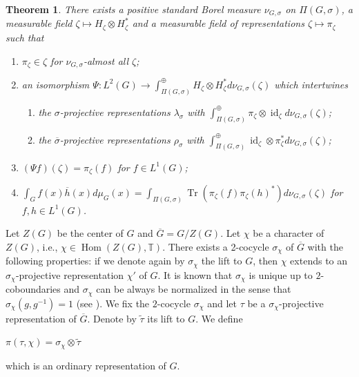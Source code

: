 \documentclass[11pt]{article}
\theoremstyle{plain}
\newtheorem{theorem}{Theorem}[section]
\theoremstyle{remark}
\theoremstyle{definition}
\DeclareMathOperator{\Hom}{Hom}
\DeclareMathOperator{\Tr}{Tr}
\DeclareMathOperator{\id}{id}
\begin{document}
\begin{theorem}\label{tprojPthm}%
There exists a positive standard Borel measure $\nu_{G,\sigma}$ on $\Pi(G,\sigma)$, a measurable field $\zeta\mapsto H_{\zeta}\otimes H_{\zeta}^{*}$ and a measurable field of representations $\zeta\mapsto \pi_{\zeta}$ such that
\begin{enumerate}
    \item $\pi_{\zeta}\in \zeta$ for $\nu_{G,\sigma}$-almost all $\zeta$;
    \item an isomorphism $\Psi\colon L^2(G)\to \int_{\Pi(G,\sigma)}^{\oplus}H_{\zeta}\otimes H_{\zeta}^{*}d \nu_{G,\sigma}(\zeta)$ which intertwines
    \begin{enumerate}
        \item the $\sigma$-projective representations $\lambda_{\sigma}$ with $\int_{\Pi(G,\sigma)}^{\oplus}\pi_{\zeta}\otimes \id_{\zeta}d \nu_{G,\sigma}(\zeta)$;
        \item the $\overline{\sigma}$-projective representations $\rho_{\sigma}$ with $\int_{\Pi(G,\sigma)}^{\oplus}\id_{\zeta}\otimes\pi_{\zeta}^{*} d \nu_{G,\sigma}(\zeta)$;
    \end{enumerate}
    \item $(\Psi f)(\zeta)=\pi_{\zeta}(f)$ for $f\in L^1(G)$;
    \item $\int_{G}f(x)\overline{h}(x)d \mu_{G}(x)=\int_{\Pi(G,\sigma)}\Tr(\pi_{\zeta}(f)\pi_{\zeta}(h)^{*})d \nu_{G,\sigma}(\zeta)$ for $f,h\in L^1(G)$. 
\end{enumerate}
\end{theorem}

Let $Z(G)$ be the center of $G$ and $\overline{G}=G/Z(G)$. 
Let $\chi$ be a character of $Z(G)$, i.e., $\chi\in \Hom(Z(G),\mathbb{T})$.   
There exists a 2-cocycle $\sigma_{\chi}$ of $\overline{G}$ with the following properties: if we denote again by $\sigma_{\chi}$ the lift to $G$, then $\chi$ extends to an $\sigma_{\chi}$-projective representation $\chi'$ of $G$. 
It is known that $\sigma_{\chi}$ is unique up to $2$-coboundaries and $\sigma_{\chi}$ can be always be normalized in the sense that $\sigma_{\chi}(g,g^{-1})=1$ (see \cite[I.\S 1]{KlepLips1972}). 
We fix the $2$-cocycle $\sigma_{\chi}$ and let $\tau$ be a $\sigma_{\chi}$-projective representation of $\overline{G}$. 
Denote by $\tilde{\tau}$ its lift to $G$. 
We define
\begin{center}
    $\pi(\tau,\chi)=\sigma_{\chi}\otimes \tilde{\tau}$
\end{center}
which is an ordinary representation of $G$.  
\end{document}
